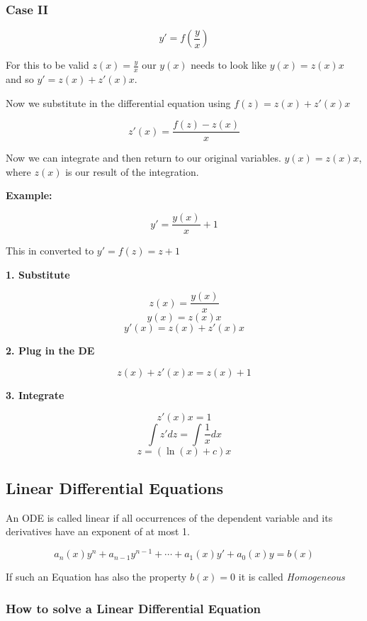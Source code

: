 \subsubsection{Case II}

\[y' = f(\frac{y}{x})\]

For this to be valid \(z(x) = \frac{y}{x}\) our \(y(x)\) needs to look like \(y(x) = z(x)x\) and so \(y' = z(x) + z'(x)x\).
\vspace{\baselineskip}

Now we substitute in the differential equation using \(f(z) = z(x) + z'(x)x\)

\[
z'(x) = \frac{f(z) - z(x)}{x}
\]

Now we can integrate and then return to our original variables. \(y(x) = z(x)x \), where \(z(x)\) is our
result of the integration.
\vspace{\baselineskip}

\textbf{Example:}
\vspace{\baselineskip}

\[y' = \frac{y(x)}{x} + 1\]

This in converted to \(y' = f(z) = z + 1\)
\vspace{\baselineskip}

\textbf{1. Substitute}

\[z(x) = \frac{y(x)}{x}\]
\[y(x) = z(x)x\]
\[y'(x) = z(x) + z'(x)x\]

\textbf{2. Plug in the DE}

\[z(x) + z'(x)x = z(x) + 1\]

\textbf{3. Integrate}

\[z'(x)x = 1\]
\[\int z' dz = \int \frac{1}{x} dx\]
\[z = (\ln(x) + c)x\]

\subsection{Linear Differential Equations}

An ODE is called linear if all occurrences of the dependent variable and its
derivatives have an exponent of at most 1.

\[a_n(x)y^n + a_{n - 1}y^{n -1} + \cdots + a_1(x)y' + a_0(x)y = b(x)\]

If such an Equation has also the property \(b(x) = 0\) it is called \emph{Homogeneous}

\subsubsection{How to solve a Linear Differential Equation}

